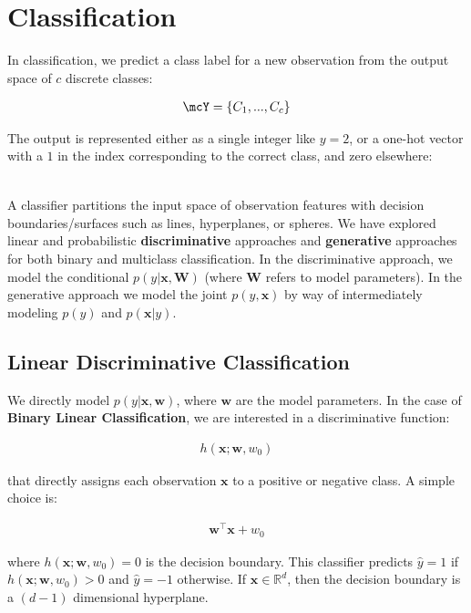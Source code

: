 \documentclass[12pt,letterpaper]{article}
\newcommand{\1}{\mathbbm{1}}
\begin{document}
\section{Classification}

In classification, we predict a class label for a new observation from the output space of $c$ discrete classes:

\begin{align}
\mcY = \{C_1,...,C_c\}
\end{align}

\noindent 
The output is represented either as a single integer like $y = 2$, or a one-hot vector with a $1$ in the index corresponding to the correct class, and zero elsewhere:

\begin{align}
[0,1,0,0,0,...]  
\end{align}


\noindent 
A classifier partitions the input space of observation features with decision boundaries/surfaces such as lines, hyperplanes, or spheres. We have explored linear and probabilistic \textbf{discriminative} approaches and \textbf{generative} approaches for both binary and multiclass classification. In the discriminative approach, we model the conditional
$p(y | \mathbf{x}, \mathbf{W})$ (where $\mathbf{W}$ refers to model parameters). In the generative approach we model the joint $p(y,\mathbf{x})$ by way of intermediately modeling $p(y)$ and $p(\mathbf{x} | y)$.

\subsection{Linear Discriminative Classification}


We directly model $p(y|\mathbf{x},\mathbf{w})$, where $\mathbf{w}$ are the model parameters. In the case of \textbf{Binary Linear Classification}, we are interested in a discriminative function:

\begin{align}
h(\mathbf{x}; \mathbf{w}, w_0)   
\end{align}

\noindent that directly assigns each observation $\mathbf{x}$ to a positive or negative class. A simple choice is:

\begin{align}
   \mathbf{w}^\top\mathbf{x} + w_0 
\end{align}

\noindent 
where $h(\mathbf{x}; \mathbf{w}, w_0) = 0$ is the decision boundary. This classifier predicts $\hat{y} = 1$ if $h(\mathbf{x}; \mathbf{w}, w_0) > 0$ and $\hat{y} = -1$ otherwise. If $\mathbf{x} \in \mathbb{R}^d$, then the decision boundary is a $(d-1)$ dimensional hyperplane.\\
\end{document}
